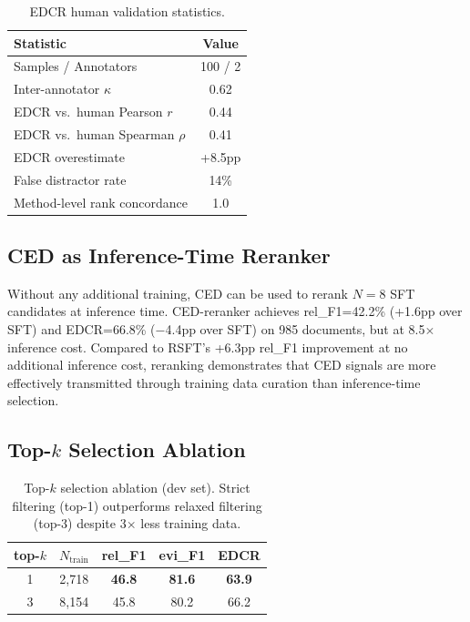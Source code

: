 \documentclass[11pt]{article}
\begin{document}
\begin{table}[t]
\centering
\small
\begin{tabular}{lc}
\toprule
\textbf{Statistic} & \textbf{Value} \\
\midrule
Samples / Annotators & 100 / 2 \\
Inter-annotator $\kappa$ & 0.62 \\
EDCR vs.\ human Pearson $r$ & 0.44 \\
EDCR vs.\ human Spearman $\rho$ & 0.41 \\
EDCR overestimate & +8.5pp \\
False distractor rate & 14\% \\
Method-level rank concordance & 1.0 \\
\bottomrule
\end{tabular}
\caption{EDCR human validation statistics.}
\label{tab:edcr_human}
\end{table}

\subsection{CED as Inference-Time Reranker}

Without any additional training, CED can be used to rerank $N{=}8$ SFT candidates at inference time.
CED-reranker achieves rel\_F1=42.2\% (+1.6pp over SFT) and EDCR=66.8\% ($-$4.4pp over SFT) on 985 documents, but at 8.5$\times$ inference cost.
Compared to RSFT's +6.3pp rel\_F1 improvement at no additional inference cost, reranking demonstrates that CED signals are more effectively transmitted through training data curation than inference-time selection.

\subsection{Top-$k$ Selection Ablation}

\begin{table}[t]
\centering
\small
\begin{tabular}{ccccc}
\toprule
\textbf{top-$k$} & \textbf{$N_\text{train}$} & \textbf{rel\_F1} & \textbf{evi\_F1} & \textbf{EDCR} \\
\midrule
1 & 2{,}718 & \textbf{46.8} & \textbf{81.6} & \textbf{63.9} \\
3 & 8{,}154 & 45.8 & 80.2 & 66.2 \\
\bottomrule
\end{tabular}
\caption{Top-$k$ selection ablation (dev set). Strict filtering (top-1) outperforms relaxed filtering (top-3) despite 3$\times$ less training data.}
\label{tab:topk}
\end{table}
\end{document}
